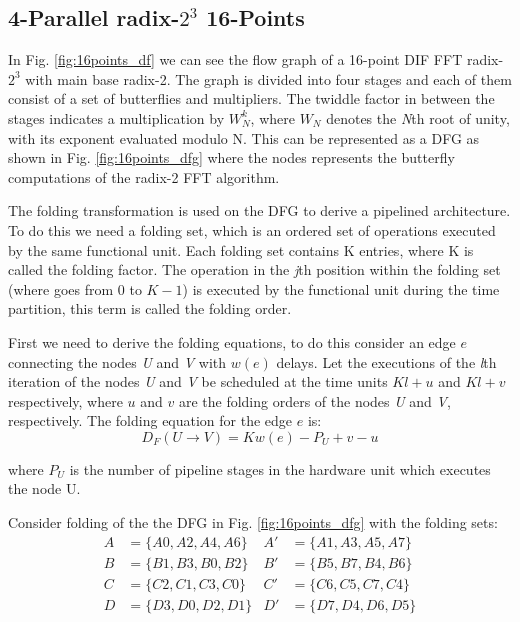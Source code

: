 \documentclass[journal,comsoc]{IEEEtran}
\begin{document}
\subsection{4-Parallel radix-$2^3$ 16-Points}
In Fig. \ref{fig:16points_df} we can see the flow graph of a 16-point DIF FFT radix-$2^3$ with main base radix-2. The graph is divided into four stages and each of them consist of a set of butterflies and multipliers. The twiddle factor in between the stages indicates a multiplication by $W^k_N$, where $W_N$ denotes the \textit{N}th root of unity, with its exponent evaluated modulo N. This can be represented as a DFG as shown in Fig. \ref{fig:16points_dfg} where the nodes represents the butterfly computations of the radix-2 FFT algorithm. 

The folding transformation is used on the DFG to derive a pipelined architecture. To do this we need a folding set, which is an ordered set of operations executed by the same functional unit. Each folding set contains K entries, where K is called the folding factor. The operation in the \textit{j}th position within the folding set (where goes from $0$ to $K-1$) is executed by the functional unit during the time partition, this term is called the folding order.

First we need to derive the folding equations, to do this consider an edge $e$ connecting the nodes \textit{U} and \textit{V} with $w(e)$ delays. Let the executions of the \textit{l}th iteration of the nodes \textit{U} and \textit{V} be scheduled at the time units $Kl+u$ and $Kl+v$ respectively, where $u$ and $v$ are the folding orders of the nodes \textit{U} and \textit{V}, respectively. The folding equation for the edge $e$ is:
\begin{equation}\label{eqn:fold_equation}
D_F(U \to V) = Kw(e)-P_U+v-u
\end{equation}

where $P_U$ is the number of pipeline stages in the hardware unit which executes the node U.

Consider folding of the the DFG in Fig. \ref{fig:16points_dfg} with the folding sets:
\begin{align*}%
A&= \{ A0,A2,A4,A6 \}  & A'&= \{ A1,A3,A5,A7 \} \\
B&=\{ B1,B3,B0,B2 \}   &B'&=\{ B5,B7,B4,B6 \} 	\\
C&=\{ C2,C1,C3,C0 \}   &C'&=\{ C6,C5,C7,C4 \} 	\\ 
D&=\{ D3,D0,D2,D1 \}   &D'&=\{ D7,D4,D6,D5 \}  
\end{align*}
\end{document}
